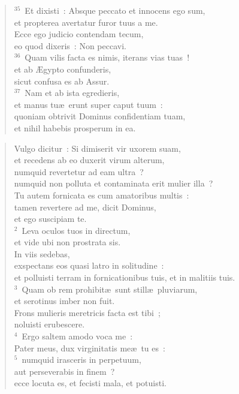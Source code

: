 \begin{flushleft}
\begin{verse}
${}^{35}$~Et dixisti~: Absque peccato et innocens ego sum,\\ et propterea avertatur furor tuus a me.\\ Ecce ego judicio contendam tecum,\\ eo quod dixeris~: Non peccavi.\\
${}^{36}$~Quam vilis facta es nimis, iterans vias tuas~!\\ et ab \AE gypto confunderis,\\ sicut confusa es ab Assur.\\
${}^{37}$~Nam et ab ista egredieris,\\ et manus tu\ae\ erunt super caput tuum~:\\ quoniam obtrivit Dominus confidentiam tuam,\\ et nihil habebis prosperum in ea.\end{verse}\end{flushleft}


\begin{flushleft}\begin{verse}\vspace{-19pt}Vulgo dicitur~: Si dimiserit vir uxorem suam,\\ et recedens ab eo duxerit virum alterum,\\ numquid revertetur ad eam ultra~?\\ numquid non polluta et contaminata erit mulier illa~?\\ Tu autem fornicata es cum amatoribus multis~:\\ tamen revertere ad me, dicit Dominus,\\ et ego suscipiam te.\\
${}^{2}$~Leva oculos tuos in directum,\\ et vide ubi non prostrata sis.\\ In viis sedebas,\\ exspectans eos quasi latro in solitudine~:\\ et polluisti terram in fornicationibus tuis, et in malitiis tuis.\\
${}^{3}$~Quam ob rem prohibit\ae\ sunt still\ae\ pluviarum,\\ et serotinus imber non fuit.\\ Frons mulieris meretricis facta est tibi~;\\ noluisti erubescere.\\
${}^{4}$~Ergo saltem amodo voca me~:\\ Pater meus, dux virginitatis me\ae\ tu es~:\\
${}^{5}$~numquid irasceris in perpetuum,\\ aut perseverabis in finem~?\\ ecce locuta es, et fecisti mala, et potuisti.\end{verse}\end{flushleft}


